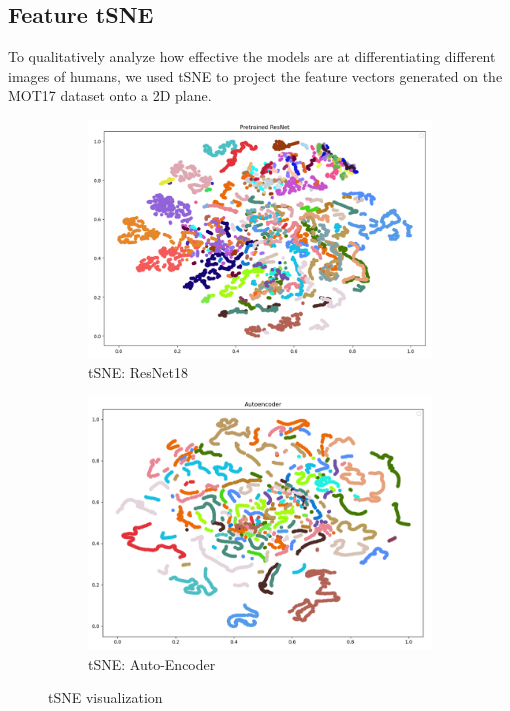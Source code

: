 \documentclass[10pt,twocolumn,letterpaper]{article}
\begin{document}
\subsection{Feature tSNE}
To qualitatively analyze how effective the models are at differentiating different images of humans, we used tSNE to project the feature vectors generated on the MOT17 dataset onto a 2D plane. 

\begin{figure}[h!]
    \centering
    \begin{subfigure}[b]{0.5\linewidth}
        \centering
        \includegraphics[width=\linewidth]{docs/reports/figs/tsne_resnet.png}
        \caption{tSNE: ResNet18}
        \label{fig:my_label}
    \end{subfigure}
    \hfill
    \begin{subfigure}[b]{0.47\linewidth}
        \centering
        \includegraphics[width=\linewidth]{docs/reports/figs/tsne_auto_encoder.png}
        \caption{tSNE: Auto-Encoder}
        \label{fig:my_label}
    \end{subfigure}
    \caption{tSNE visualization}
\end{figure}
\end{document}
